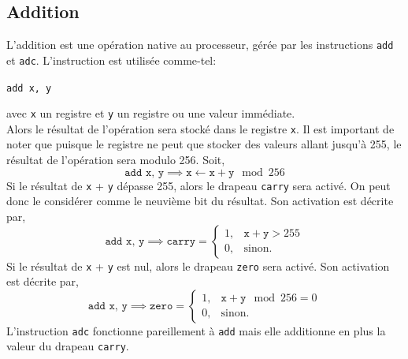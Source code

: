 \documentclass{article}
\begin{document}
\subsection{Addition}
L'addition est une opération native au processeur, gérée par les instructions \texttt{add} et \texttt{adc}.
L'instruction est utilisée comme-tel:\\

\begin{center}
\texttt{add x, y}
\end{center}
avec \texttt{x} un registre et \texttt{y} un registre ou une valeur immédiate.\\Alors le résultat de l'opération sera stocké dans le registre \texttt{x}. Il est important de noter que puisque le registre ne peut que stocker des valeurs allant jusqu'à 255, le résultat de l'opération sera modulo 256.
Soit, 
$$\texttt{add x, y} \implies \texttt{x} \leftarrow \texttt{x} + \texttt{y} \mod 256$$
Si le résultat de \texttt{x} + \texttt{y} dépasse 255, alors le drapeau \texttt{carry} sera activé. On peut donc le considérer comme le neuvième bit du résultat. Son activation est décrite par,
$$\texttt{add x, y} \implies \texttt{carry} = \begin{cases}
1, & \texttt{x} + \texttt{y} > 255\\
0, & \text{sinon.}
\end{cases}$$
Si le résultat de \texttt{x} + \texttt{y} est nul, alors le drapeau \texttt{zero} sera activé. Son activation est décrite par,
$$\texttt{add x, y} \implies \texttt{zero} = \begin{cases}
1, & \texttt{x} + \texttt{y}\mod 256= 0\\
0, & \text{sinon.}
\end{cases}$$
L'instruction \texttt{adc} fonctionne pareillement à \texttt{add} mais elle additionne en plus la valeur du drapeau \texttt{carry}.
\end{document}
